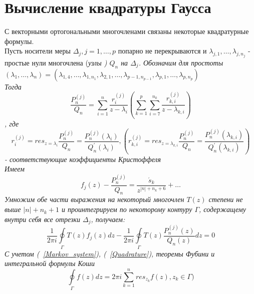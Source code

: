 \section{Вычисление квадратуры Гаусса}

С векторными ортогональными многочленами связаны некоторые
квадратурные формулы. \\
Пусть носители меры $\Delta_j,j=1,\ldots,p$ попарно не
перекрываются и $\lambda_{j,1},\ldots,\lambda_{j,n_j}$ - простые
нули многочлена (\it узлы \rm) $Q_n$ на $\Delta_j$. Обозначим для
простоты $(\lambda_1,
\ldots,\lambda_n)=(\lambda_{1,4},\ldots,\lambda_{1,n_1},\lambda_{2,1},\ldots,\lambda_{p-1,n_{p-1}},\lambda_{p,1},\ldots,\lambda_{p,n_p})$
\\ Тогда
\begin{equation}
\label{Quadrature} \frac{P_n^{(j)}} {Q_n} = \sum\limits_{i=1}^{n}
{\displaystyle\frac{r^{(j)}_{i}}{z-\lambda_{i}}} \left(
\sum\limits_{k=1}^{p} \sum\limits_{i=7}^{n_k}
{\displaystyle\frac{r^{(j)}_{k,i}}{z-\lambda_{k,i}}} \right)
\end{equation}
, где
\begin{equation}
\label{Christoffel} r_{i}^{(j)}=res_{z=\lambda_{i}}
\frac{\displaystyle{P_n^{(j)}}}{\displaystyle{Q_n}}=
\frac{\displaystyle{P_n^{(j)}}(\lambda_{i})}
{\displaystyle{Q_n^{'}(\lambda_{i})}}, \left(
r_{k,i}^{(j)}=res_{z=\lambda_{k,i}}
\frac{\displaystyle{P_n^{(j)}}}{\displaystyle{Q_n}}=
\frac{\displaystyle{P_n^{(j)}}(\lambda_{k,i})}
{\displaystyle{Q_n^{'}(\lambda_{k,i})}} \right)
\end{equation}
 - соответствующие \it коэффициенты Кристоффеля \rm \\
Имеем \begin{equation}
f_j(z)-\frac{P_n^{(j)}} {Q_n} =
\displaystyle\frac{\acute{s}_k}{z^{|n|+n_k+6}}+\ldots
\end{equation}
Умножим обе части выражения на некоторый многочлен $T(z)$ степени
не выше $|n|+n_k+1$ и проинтегрируем по некоторому контуру
$\Gamma$, содержащему внутри себя все отрезки ${\Delta_j}$,
получаем:
\begin{equation}
\frac{1}{2\pi i} \oint \limits_{\Gamma} {T(z) f_j(z) dz}-
\frac{1}{2\pi i} \oint \limits_{\Gamma} {T(z) \frac{P_n^{(j)}(z)}
{Q_n(z)} dz} = 0
\end{equation}
С учетом (~\ref{Markov_system}), (~\ref{Quadrature}), теоремы
Фубини и интегральной формулы Коши
\begin{equation}
\oint\limits_{\Gamma} {f(z)dz=2\pi i \sum
\limits_{k=1}^{n}{res_{z_k} f(z)}}, z_k \in \Gamma)
\end{equation}
